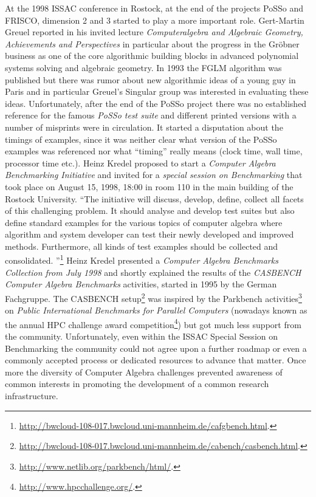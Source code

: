 \documentclass[a4paper,11pt]{article}
\begin{document}
At the 1998 ISSAC conference in Rostock, at the end of the projects PoSSo and
FRISCO, dimension 2 and 3 started to play a more important role.  Gert-Martin
Greuel reported in his invited lecture \emph{Computeralgebra and Algebraic
  Geometry, Achievements and Perspectives} in particular about the progress in
the Gr\"obner business as one of the core algorithmic building blocks in
advanced polynomial systems solving and algebraic geometry.  In 1993 the FGLM
algorithm was published but there was rumor about new algorithmic ideas of a
young guy in Paris and in particular Greuel's Singular group was interested in
evaluating these ideas.  Unfortunately, after the end of the PoSSo project
there was no established reference for the famous \emph{PoSSo test suite} and
different printed versions with a number of misprints were in circulation.  It
started a disputation about the timings of examples, since it was neither clear
what version of the PoSSo examples was referenced nor what ``timing'' really
means (clock time, wall time, processor time etc.).  Heinz Kredel proposed to
start a \emph{Computer Algebra Benchmarking Initiative} and invited for a
\emph{special session on Benchmarking} that took place on August 15, 1998,
18:00 in room 110 in the main building of the Rostock University.  ``The
initiative will discuss, develop, define, collect all facets of this
challenging problem. It should analyse and develop test suites but also define
standard examples for the various topics of computer algebra where algorithm
and system developer can test their newly developed and improved
methods. Furthermore, all kinds of test examples should be collected and
consolidated. ''\footnote{\url{http://bwcloud-108-017.bwcloud.uni-mannheim.de/cafgbench.html}.}
Heinz Kredel presented a \emph{Computer Algebra Benchmarks Collection from July
  1998} and shortly explained the results of the \emph{CASBENCH Computer
  Algebra Benchmarks} activities, started in 1995 by the German Fachgruppe.
The CASBENCH
setup\footnote{\url{http://bwcloud-108-017.bwcloud.uni-mannheim.de/cabench/casbench.html}.}
was inspired by the Parkbench
activities\footnote{\url{http://www.netlib.org/parkbench/html/}.} on
\emph{Public International Benchmarks for Parallel Computers} (nowadays known
as the annual HPC challenge award
competition\footnote{\url{http://www.hpcchallenge.org/}.}) but got much less
support from the community. Unfortunately, even within the ISSAC Special
Session on Benchmarking the community could not agree upon a further roadmap or
even a commonly accepted process or dedicated resources to advance that
matter. Once more the diversity of Computer Algebra challenges prevented
awareness of common interests in promoting the development of a common research
infrastructure.
\end{document}
